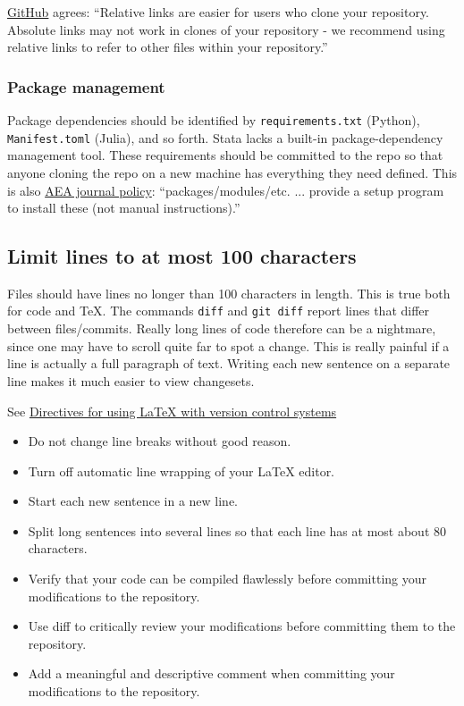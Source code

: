 \href{https://help.github.com/articles/about-readmes/\#relative-links-and-image-paths-in-readme-files}{GitHub} agrees:
``Relative links are easier for users who clone your repository. Absolute links may not work in clones of your repository - we recommend using relative links to refer to other files within your repository.''

\subsubsection{Package management}

Package dependencies should be identified by \texttt{requirements.txt} (Python), \texttt{Manifest.toml} (Julia), and so forth.
Stata lacks a built-in package-dependency management tool.
These requirements should be committed to the repo so that anyone cloning the repo on a new machine has everything they need defined.
This is also \href{https://aeadataeditor.github.io/aea-de-guidance/preparing-for-data-deposit.html}{AEA journal policy}:
``packages/modules/etc. ... provide a setup program to install these (not manual instructions).''

\subsection{Limit lines to at most 100 characters}

Files should have lines no longer than 100 characters in length.
This is true both for code and \TeX.
The commands \texttt{diff} and \texttt{git diff} report lines that differ between files/commits.
Really long lines of code therefore can be a nightmare, since one may have to scroll quite far to spot a change.
This is really painful if a line is actually a full paragraph of text.
Writing each new sentence on a separate line makes it much easier to view changesets.

See \href{https://en.wikibooks.org/wiki/LaTeX/Collaborative_Writing_of_LaTeX_Documents\#Subversion_really_makes_the_difference}{Directives for using LaTeX with version control systems}
\begin{itemize}
\item Do not change line breaks without good reason.
\item Turn off automatic line wrapping of your LaTeX editor.
\item Start each new sentence in a new line.
\item Split long sentences into several lines so that each line has at most about 80 characters.
\item Verify that your code can be compiled flawlessly before committing your modifications to the repository.
\item Use diff to critically review your modifications before committing them to the repository.
\item Add a meaningful and descriptive comment when committing your modifications to the repository.
\end{itemize}
